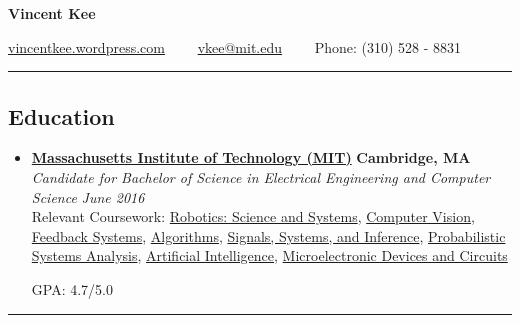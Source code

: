\documentclass[10pt,letterpaper]{article}
\begin{document}
\begin{center}
{\huge \textbf{Vincent Kee}}

\href{http://vincentkee.wordpress.com}{vincentkee.wordpress.com}\ \ \textbullet
\ \ \href{mailto:vkee@mit.edu}{vkee@mit.edu}\ \ \textbullet
\ \  Phone: (310) 528 - 8831
\end{center}

\hrule
\vspace{-0.6em}

\subsection*{Education}
  \begin{itemize}
    \parskip=-0.1em

    \item[]
    {\href{http://mit.edu/}{\textbf{Massachusetts Institute of Technology (MIT)}} \hfill
      \textbf{Cambridge, MA}}
    \\
    {\emph{Candidate for Bachelor of Science in Electrical Engineering and Computer Science} \hfill
      \emph{June 2016}}\\
      Relevant Coursework: \href{http://student.mit.edu/catalog/search.cgi?search=6.141&style=verbatim}{Robotics: Science and Systems}, \href{http://student.mit.edu/catalog/search.cgi?search=6.869&style=verbatim}{Computer Vision}, \href{http://student.mit.edu/catalog/search.cgi?search=6.302&style=verbatim}{Feedback Systems}, \href{http://student.mit.edu/catalog/search.cgi?search=6.006&style=verbatim}{Algorithms}, \href{http://student.mit.edu/catalog/search.cgi?search=6.011&style=verbatim}{Signals, Systems, and Inference}, \href{http://student.mit.edu/catalog/search.cgi?search=6.041&style=verbatim}{Probabilistic Systems Analysis}, \href{http://student.mit.edu/catalog/search.cgi?search=6.034&style=verbatim}{Artificial Intelligence}, \href{http://student.mit.edu/catalog/search.cgi?search=6.012&style=verbatim}{Microelectronic Devices and Circuits}

GPA: 4.7/5.0

  \end{itemize}

\hrule
\vspace{-0.6em}

\end{document}
